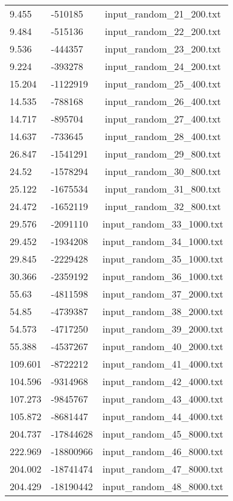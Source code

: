 \begin{longtable}[hb]{|l|l|c|}
    9.455 & -510185 & input\_random\_21\_200.txt \\
    9.484 & -515136 & input\_random\_22\_200.txt \\
    9.536 & -444357 & input\_random\_23\_200.txt \\
    9.224 & -393278 & input\_random\_24\_200.txt \\
    15.204 & -1122919 & input\_random\_25\_400.txt \\
    14.535 & -788168 & input\_random\_26\_400.txt \\
    14.717 & -895704 & input\_random\_27\_400.txt \\
    14.637 & -733645 & input\_random\_28\_400.txt \\
    26.847 & -1541291 & input\_random\_29\_800.txt \\
    24.52 & -1578294 & input\_random\_30\_800.txt \\
    25.122 & -1675534 & input\_random\_31\_800.txt \\
    24.472 & -1652119 & input\_random\_32\_800.txt \\
    29.576 & -2091110 & input\_random\_33\_1000.txt \\
    29.452 & -1934208 & input\_random\_34\_1000.txt \\
    29.845 & -2229428 & input\_random\_35\_1000.txt \\
    30.366 & -2359192 & input\_random\_36\_1000.txt \\
    55.63 & -4811598 & input\_random\_37\_2000.txt \\
    54.85 & -4739387 & input\_random\_38\_2000.txt \\
    54.573 & -4717250 & input\_random\_39\_2000.txt \\
    55.388 & -4537267 & input\_random\_40\_2000.txt \\
    109.601 & -8722212 & input\_random\_41\_4000.txt \\
    104.596 & -9314968 & input\_random\_42\_4000.txt \\
    107.273 & -9845767 & input\_random\_43\_4000.txt \\
    105.872 & -8681447 & input\_random\_44\_4000.txt \\
    204.737 & -17844628 & input\_random\_45\_8000.txt \\
    222.969 & -18800966 & input\_random\_46\_8000.txt \\
    204.002 & -18741474 & input\_random\_47\_8000.txt \\
    204.429 & -18190442 & input\_random\_48\_8000.txt \\

\end{longtable}
